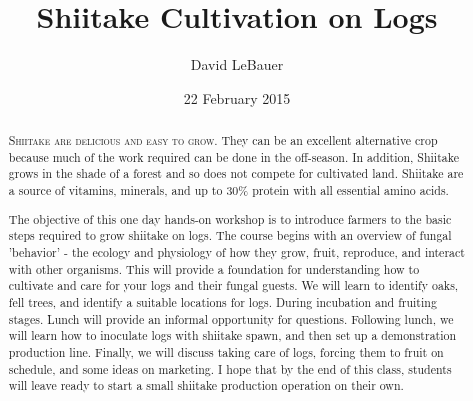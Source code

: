\documentclass{tufte-handout}
\title{Shiitake Cultivation on Logs}
\author{David LeBauer}
\date{22 February 2015}  %
\begin{document}
\maketitle%


\begin{abstract}
\noindent \textsc{Shiitake are delicious and easy to grow.} They can be an excellent alternative crop because much of the work required can be done in the off-season. In addition, Shiitake grows in the shade of a forest and so does not compete for cultivated land. Shiitake are a source of vitamins, minerals, and up to 30\%
protein with all essential amino acids.
 
The objective of this one day hands-on workshop is to introduce farmers to the basic steps required to grow shiitake on logs. 
The course begins with an overview of fungal 'behavior' - the ecology and physiology of how they grow, fruit, reproduce, and interact with other organisms. 
This will provide a foundation for understanding how to cultivate and care for your logs and their fungal guests. We will learn to identify oaks, fell trees, and identify a suitable locations for logs. During incubation and fruiting stages. Lunch will provide an informal opportunity for questions. Following lunch, we will learn how to inoculate logs with shiitake spawn, and then set up a demonstration production line. Finally, we will discuss taking care of logs, forcing them to fruit on schedule, and some ideas on marketing. 
I hope that by the end of this class, students will leave ready to start a small shiitake production operation on their own. 
\end{abstract}


\end{document}

